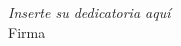 \documentclass[\main/main.tex]{subfiles}
\begin{document}
\begin{titlepage}
	\nonumber
	\null{}
	\begin{flushright}
		\textit{
			Inserte su dedicatoria aquí
			}\\[5mm]
			Firma
	\end{flushright}
	\null
\end{titlepage}
\end{document}
